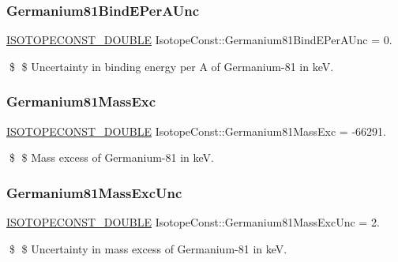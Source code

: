 \subsubsection{\texorpdfstring{Germanium81\+Bind\+E\+Per\+A\+Unc}{Germanium81BindEPerAUnc}}
{\footnotesize\ttfamily \mbox{\hyperlink{group___isotope_const-_macros_ga8f45a7272ce02c0b4c65c44636ed719a}{I\+S\+O\+T\+O\+P\+E\+C\+O\+N\+S\+T\+\_\+\+D\+O\+U\+B\+LE}} Isotope\+Const\+::\+Germanium81\+Bind\+E\+Per\+A\+Unc = 0.}

\$ \$ Uncertainty in binding energy per A of Germanium-\/81 in keV. \mbox{\label{group___isotope_const-_germanium-_ge81_ga24e4f29bc553d3df2368b14e869db8a6}} 
\subsubsection{\texorpdfstring{Germanium81\+Mass\+Exc}{Germanium81MassExc}}
{\footnotesize\ttfamily \mbox{\hyperlink{group___isotope_const-_macros_ga8f45a7272ce02c0b4c65c44636ed719a}{I\+S\+O\+T\+O\+P\+E\+C\+O\+N\+S\+T\+\_\+\+D\+O\+U\+B\+LE}} Isotope\+Const\+::\+Germanium81\+Mass\+Exc = -\/66291.}

\$ \$ Mass excess of Germanium-\/81 in keV. \mbox{\label{group___isotope_const-_germanium-_ge81_ga71bb294a6b84d32ac69df047b57b1fbf}} 
\subsubsection{\texorpdfstring{Germanium81\+Mass\+Exc\+Unc}{Germanium81MassExcUnc}}
{\footnotesize\ttfamily \mbox{\hyperlink{group___isotope_const-_macros_ga8f45a7272ce02c0b4c65c44636ed719a}{I\+S\+O\+T\+O\+P\+E\+C\+O\+N\+S\+T\+\_\+\+D\+O\+U\+B\+LE}} Isotope\+Const\+::\+Germanium81\+Mass\+Exc\+Unc = 2.}

\$ \$ Uncertainty in mass excess of Germanium-\/81 in keV. \mbox{\label{group___isotope_const-_germanium-_ge81_ga4e87958e5c25748605aa00e49779ec49}} 
